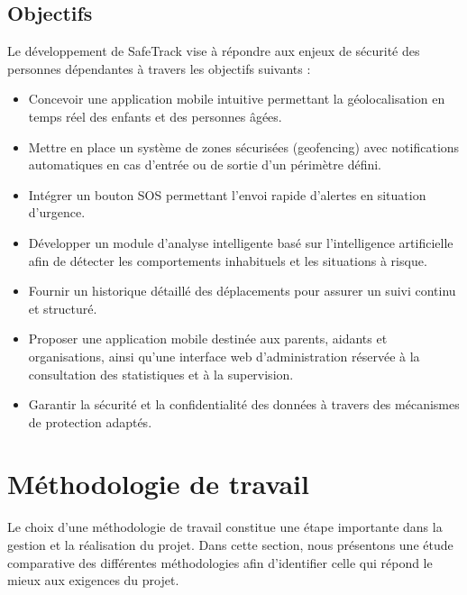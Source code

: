 \subsection{Objectifs}

Le développement de SafeTrack vise à répondre aux enjeux de sécurité des personnes dépendantes à travers les objectifs suivants :

\begin{itemize}
    \item Concevoir une application mobile intuitive permettant la géolocalisation en temps réel des enfants et des personnes âgées.
    
    \item Mettre en place un système de zones sécurisées (geofencing) avec notifications automatiques en cas d'entrée ou de sortie d'un périmètre défini.
    
    \item Intégrer un bouton SOS permettant l'envoi rapide d'alertes en situation d'urgence.
    
    \item Développer un module d'analyse intelligente basé sur l'intelligence artificielle afin de détecter les comportements inhabituels et les situations à risque.
    
    \item Fournir un historique détaillé des déplacements pour assurer un suivi continu et structuré.
    
    \item Proposer une application mobile destinée aux parents, aidants et organisations, ainsi qu'une interface web d'administration réservée à la consultation des statistiques et à la supervision.
    
    \item Garantir la sécurité et la confidentialité des données à travers des mécanismes de protection adaptés.
\end{itemize} 

\section{Méthodologie de travail}

Le choix d'une méthodologie de travail constitue une étape importante dans la gestion et la réalisation du projet. Dans cette section, nous présentons une étude comparative des différentes méthodologies afin d'identifier celle qui répond le mieux aux exigences du projet.


